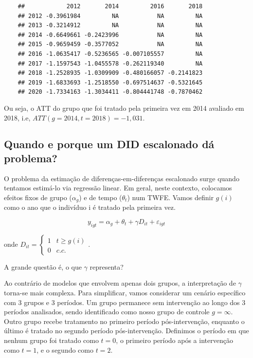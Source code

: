 \documentclass[portugues]{article}
\begin{document}
\begin{boxA}
 \begin{verbatim}
    ##            2012       2014         2016       2018
    ## 2012 -0.3961984         NA           NA         NA
    ## 2013 -0.3214912         NA           NA         NA
    ## 2014 -0.6649661 -0.2423996           NA         NA
    ## 2015 -0.9659459 -0.3577052           NA         NA
    ## 2016 -1.0635417 -0.5236565 -0.007105557         NA
    ## 2017 -1.1597543 -1.0455578 -0.262119340         NA
    ## 2018 -1.2528935 -1.0309909 -0.480166057 -0.2141823
    ## 2019 -1.6833693 -1.2518550 -0.697514637 -0.5321645
    ## 2020 -1.7334163 -1.3034411 -0.804441748 -0.7870462
\end{verbatim}

    Ou seja, o ATT do grupo que foi tratado pela primeira vez em 2014 avaliado em 2018, i.e, $ATT(g=2014, t=2018) = -1,031$.
    
    
\end{boxA}

\subsection{Quando e porque um DID escalonado dá problema?}

O problema da estimação de diferenças-em-diferenças escalonado surge quando tentamos estimá-lo via regressão linear. Em geral, neste contexto, colocamos efeitos fixos de grupo ($\alpha_g$) e de tempo ($\theta_t$) num TWFE. Vamos definir $g(i)$ como o ano que o indivíduo i é tratado pela primeira vez. 

\begin{equation}\label{eq:did_stag_reg}
    y_{igt} = \alpha_g + \theta_t + \gamma D_{it} + \varepsilon_{igt}
\end{equation}

\noindent onde $D_{it} = \begin{cases} 1 & t \geq g(i) \\ 0 & c.c.  \end{cases}$. 

A grande questão é, o que $\gamma$ representa?

Ao contrário de modelos que envolvem apenas dois grupos, a interpretação de $\gamma$ torna-se mais complexa. Para simplificar, vamos considerar um cenário específico com 3 grupos e 3 períodos. Um grupo permanece sem intervenção ao longo dos 3 períodos analisados, sendo identificado como nosso grupo de controle $g = \infty$. Outro grupo recebe tratamento no primeiro período pós-intervenção, enquanto o último é tratado no segundo período pós-intervenção. Definimos o período em que nenhum grupo foi tratado como $t=0$, o primeiro período após a intervenção como $t=1$, e o segundo como $t=2$.
\end{document}
